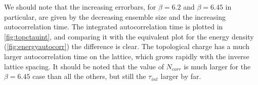 We should note that the increasing errorbars, for $\beta = 6.2$ and $\beta = 6.45$ in particular, are given by the decreasing ensemble size and the increasing autocorrelation time. The integrated autocorrelation time is plotted in \cref{fig:topctauint}, and comparing it with the equivalent plot for the energy density (\cref{fig:energyautocorr}) the difference is clear. The topological charge has a much larger autocorrelation time on the lattice, which grows rapidly with the inverse lattice spacing. It should be noted that the value of $N_{corr}$ is much larger for the $\beta=6.45$ case than all the others, but still the $\tau_{int}$ larger by far.

